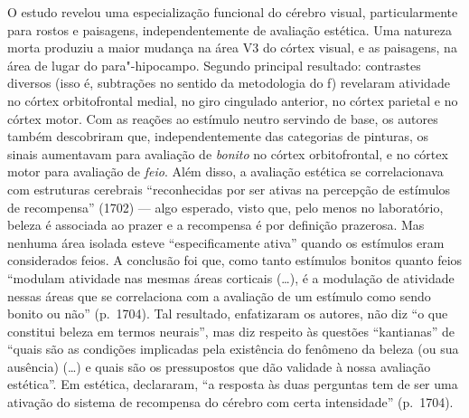 O estudo revelou uma especialização funcional do cérebro visual,
particularmente para rostos e paisagens, independentemente de avaliação
estética. Uma natureza morta produziu a maior mudança na área V3 do
córtex visual, e as paisagens, na área de lugar do para"-hipocampo.
Segundo principal resultado: contrastes diversos (isso é, subtrações no
sentido da metodologia do f) revelaram atividade no córtex
orbitofrontal medial, no giro cingulado anterior, no córtex parietal e
no córtex motor. Com as reações ao estímulo neutro servindo de base, os
autores também descobriram que, independentemente das categorias de
pinturas, os sinais aumentavam para avaliação de \emph{bonito} no córtex
orbitofrontal, e no córtex motor para avaliação de \emph{feio}. Além
disso, a avaliação estética se correlacionava com estruturas cerebrais
``reconhecidas por ser ativas na percepção de estímulos de recompensa''
(1702) --- algo esperado, visto que, pelo menos no laboratório, beleza é
associada ao prazer e a recompensa é por definição prazerosa. Mas
nenhuma área isolada esteve ``especificamente ativa'' quando os
estímulos eram considerados feios. A conclusão foi que, como tanto
estímulos bonitos quanto feios ``modulam atividade nas mesmas áreas
corticais (\ldots{}), é a modulação de atividade nessas áreas que se
correlaciona com a avaliação de um estímulo como sendo bonito ou não''
(p.~1704). Tal resultado, enfatizaram os autores, não diz ``o que
constitui beleza em termos neurais'', mas diz respeito às questões
``kantianas'' de ``quais são as condições implicadas pela existência do
fenômeno da beleza (ou sua ausência) (\ldots{}) e quais são os pressupostos
que dão validade à nossa avaliação estética''. Em estética, declararam,
``a resposta às duas perguntas tem de ser uma ativação do sistema de
recompensa do cérebro com certa intensidade'' (p.~1704).


